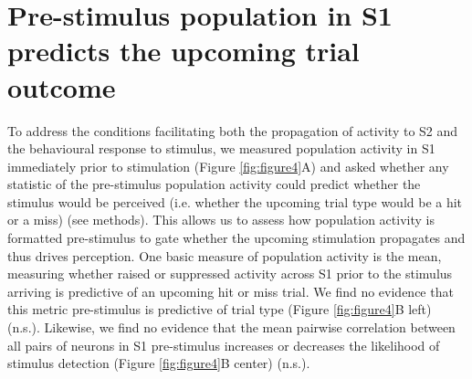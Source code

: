 \section{Pre-stimulus population in S1 predicts the upcoming trial outcome}

To address the conditions facilitating both the propagation of activity to S2 and the behavioural response to stimulus, we measured population activity in S1 immediately prior to stimulation (Figure \ref{fig:figure4}A) and asked whether any statistic of the pre-stimulus population activity could predict whether the stimulus would be perceived (i.e. whether the upcoming trial type would be a hit or a miss) (see methods). This allows us to assess how population activity is formatted pre-stimulus to gate whether the upcoming stimulation propagates and thus drives perception. One basic measure of population activity is the mean, measuring whether raised or suppressed activity across S1 prior to the stimulus arriving is predictive of an upcoming hit or miss trial. We find no evidence that this metric pre-stimulus is predictive of trial type (Figure \ref{fig:figure4}B left) (n.s.). Likewise, we find no evidence that the mean pairwise correlation between all pairs of neurons in S1 pre-stimulus increases or decreases the likelihood of stimulus detection (Figure \ref{fig:figure4}B center) (n.s.).


